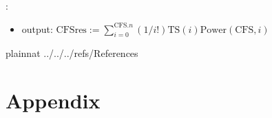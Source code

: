 \documentclass[12pt, titlepage]{article}
\begin{document}
\noindent {}:
\begin{itemize}
	\item output: $\text{CFSres}:=\sum_{i=0}^{\text{CFS}.n}(1/i!)\text{TS}(i)\text{Power}(\text{CFS}, i)$
\end{itemize}

\newpage

 {plainnat}
 {../../../refs/References}

\newpage

\section{Appendix} \label{Appendix}

\end{document}
